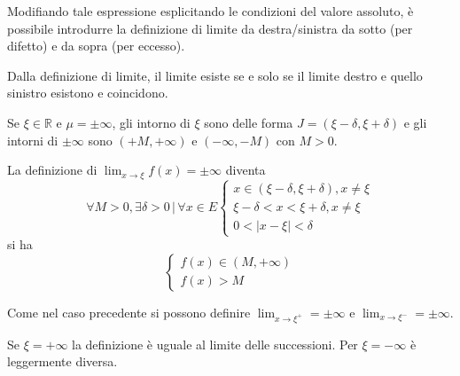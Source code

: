 \documentclass[a4paper]{article}
\begin{document}
Modifiando tale espressione esplicitando le condizioni del valore assoluto, è possibile
introdurre la definizione di limite da destra/sinistra da sotto (per difetto)
e da sopra (per eccesso).


Dalla definizione di limite, il limite esiste se e solo se
il limite destro e quello sinistro esistono e coincidono.

Se \(\xi \in \mathbb{R}\) e \(\mu = \pm \infty\),
gli intorno di \(\xi\) sono delle forma \(J=(\xi - \delta, \xi + \delta)\)
e gli intorni di \(\pm \infty\) sono \((+M, +\infty)\) e \((-\infty, -M)\)
con \(M>0\).

La definizione di \(\lim_{x \to \xi} f(x) = \pm \infty\)
diventa
\[
    \forall M > 0, \exists \delta > 0 \,|\, \forall x \in E
    \begin{cases}
        x \in (\xi - \delta, \xi + \delta), x \neq \xi \\
        \xi - \delta < x < \xi + \delta, x \neq \xi \\
        0 < |x - \xi| < \delta
    \end{cases}
\]
si ha
\[
    \begin{cases}
        f(x) \in (M, +\infty) \\
        f(x) > M
    \end{cases}
\]

Come nel caso precedente si possono definire \(\lim_{x \to \xi^+} = \pm\infty\)
e \(\lim_{x \to \xi^-} = \pm\infty\).

Se \(\xi = +\infty\) la definizione è uguale al limite delle successioni.
Per \(\xi = -\infty\) è leggermente diversa.
\end{document}

